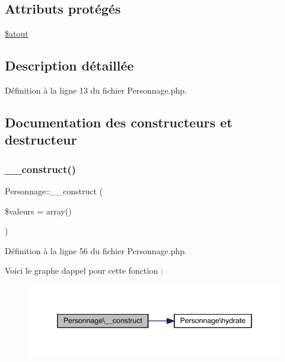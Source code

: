 \subsection*{Attributs protégés}
\begin{DoxyCompactItemize}
\item 
\mbox{\hyperlink{class_personnage_a8f907b4e3eddc4042ca7b0a30a7df51c}{\$atout}}
\end{DoxyCompactItemize}


\subsection{Description détaillée}


Définition à la ligne 13 du fichier Personnage.\+php.



\subsection{Documentation des constructeurs et destructeur}
\mbox{\label{class_personnage_ad91c080e67c8a8487933af4a38ea46cb}} 
\subsubsection{\texorpdfstring{\+\_\+\+\_\+construct()}{\_\_construct()}}
{\footnotesize\ttfamily Personnage\+::\+\_\+\+\_\+construct (\begin{DoxyParamCaption}\item[{}]{\$valeurs = {\ttfamily array()} }\end{DoxyParamCaption})}



Définition à la ligne 56 du fichier Personnage.\+php.

Voici le graphe d\textquotesingle{}appel pour cette fonction \+:\nopagebreak
\begin{figure}[H]
\begin{center}
\leavevmode
\includegraphics[width=346pt]{class_personnage_ad91c080e67c8a8487933af4a38ea46cb_cgraph}
\end{center}
\end{figure}


